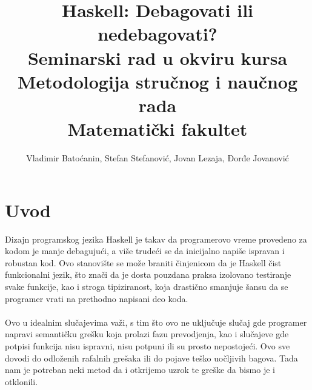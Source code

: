 \documentclass[a4paper]{article}
\begin{document}
\title{Haskell: Debagovati ili nedebagovati?\\ \small{Seminarski rad u okviru kursa\\Metodologija stručnog i naučnog rada\\ Matematički fakultet}}

\author{Vladimir Batoćanin, Stefan Stefanović, Jovan Lezaja, Đorđe Jovanović}


\maketitle


\setcounter{tocdepth}{1} %
\tableofcontents

\newpage

\section{Uvod}
\label{sec:uvod}

{Dizajn programskog jezika Haskell je takav da programerovo vreme provedeno za kodom je manje debagujući, a više trudeći se da inicijalno napiše ispravan i robustan kod. Ovo stanovište se može braniti činjenicom da je Haskell čist funkcionalni jezik, što znači da je dosta pouzdana praksa izolovano testiranje svake funkcije, kao i stroga tipiziranost, koja drastično smanjuje šansu da se programer vrati na prethodno napisani deo koda. 
\\ \\
Ovo u idealnim slučajevima važi, s tim što ovo ne uključuje slučaj gde programer napravi semantičku grešku koja prolazi fazu prevodjenja, kao i slučajeve gde potpisi funkcija nisu ispravni, nisu potpuni ili su prosto nepostojeći. Ovo sve dovodi do odloženih rafalnih grešaka ili do pojave teško uočljivih bagova. Tada nam je potreban neki metod da i otkrijemo uzrok te greške da bismo je i otklonili.}
\end{document}

